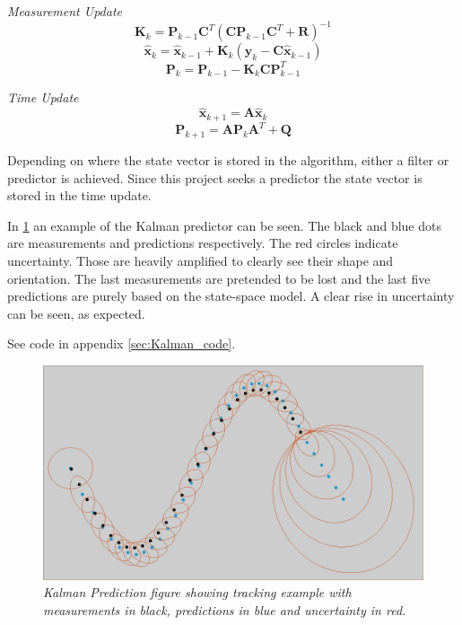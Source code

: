 \emph{Measurement Update}
\begin{equation}
	\textbf{K}_{k} = \textbf{P}_{k-1}\textbf{C}^T(\textbf{C}\textbf{P}_{k-1}\textbf{C}^T + \textbf{R})^{-1}
\end{equation}
\begin{equation}
	\hat{\textbf{x}}_k = \hat{\textbf{x}}_{k-1} + \textbf{K}_k (\textbf{y}_k - \textbf{C}\hat{\textbf{x}}_{k-1})
\end{equation}
\begin{equation}
	\textbf{P}_k = \textbf{P}_{k-1} - \textbf{K}_k\textbf{C}\textbf{P}_{k-1}^T
\end{equation}

\emph{Time Update}
\begin{equation}
	\hat{\textbf{x}}_{k+1} = \textbf{A}\hat{\textbf{x}}_{k}
\end{equation}
\begin{equation}
	\textbf{P}_{k+1} = \textbf{A}\textbf{P}_{k}\textbf{A}^T + \textbf{Q}
\end{equation}

Depending on where the state vector is stored in the algorithm, either a filter or predictor is achieved. Since this project seeks a predictor the state vector is stored in the time update.

In \ref{fig:kalman_fig} an example of the Kalman predictor can be seen. The black and blue dots are measurements and predictions respectively. The red circles indicate uncertainty. Those are heavily amplified to clearly see their shape and orientation. The last measurements are pretended to be lost and the last five predictions are purely based on the state-space model. A clear rise in uncertainty can be seen, as expected. 
 
See code in appendix \ref{sec:Kalman_code}. %

\begin{figure}[htb]
	\centering
	\includegraphics[width=\linewidth]{images/Kalmask2}
	\caption{\textit{Kalman Prediction figure showing tracking example with measurements in black, predictions in blue and uncertainty in red.}}
	\label{fig:kalman_fig} %
\end{figure}